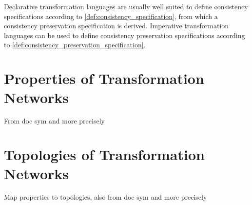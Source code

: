 
Declarative transformation languages are usually well suited to define consistency specifications according to \autoref{def:consistency_specification}, 
from which a consistency preservation specification is %
derived. 
Imperative transformation languages can be used to define consistency preservation specifications according to \autoref{def:consistency_preservation_specification}. 

\section{Properties of Transformation Networks}
From doc sym and more precisely


\section{Topologies of Transformation Networks}
Map properties to topologies, also from doc sym and more precisely